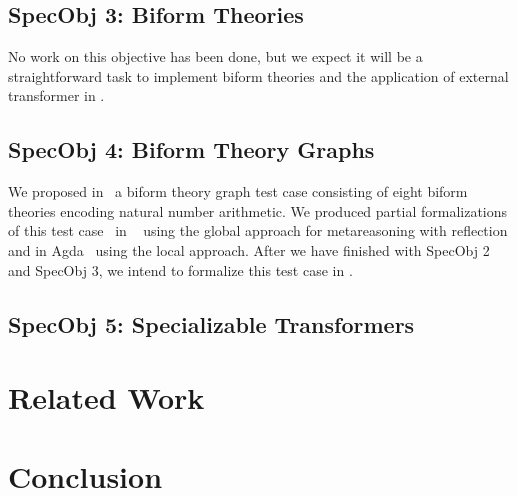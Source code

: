 \documentclass[fleqn]{llncs}
\begin{document}
\subsection*{SpecObj 3: Biform Theories}

No work on this objective has been done, but we expect it will be a
straightforward task to implement biform theories and the application
of external transformer in {\HLQE}.

\subsection*{SpecObj 4: Biform Theory Graphs}

We proposed in~\cite{CaretteFarmer17} a biform theory graph test case
consisting of eight biform theories encoding natural number
arithmetic.  We produced partial formalizations of this test
case~\cite{CaretteFarmer17} in {\churchuqe}~\cite{Farmer17} using the
global approach for metareasoning with reflection and in
Agda~\cite{Norell07,Norell09} using the local approach.  After we have
finished with SpecObj 2 and SpecObj 3, we intend to formalize this
test case in {\HLQE}.

\subsection*{SpecObj 5: Specializable Transformers}




\section{Related Work}


\section{Conclusion}




\setcounter{tocdepth}{1}
\listoftodos
\setcounter{tocdepth}{0}
\end{document}
